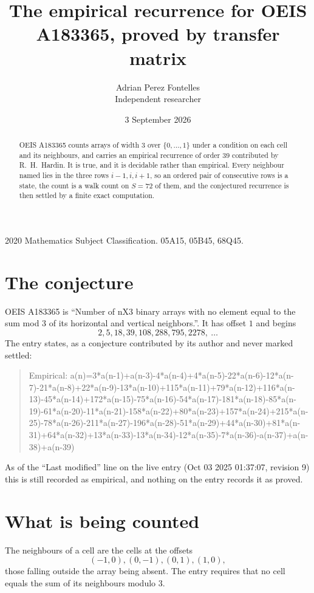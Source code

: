 \documentclass[11pt,a4paper]{article}
\title{The empirical recurrence for OEIS A183365, proved by transfer matrix}
\author{Adrian Perez Fontelles\\ \small Independent researcher}
\date{3 September 2026}
\theoremstyle{plain}
\theoremstyle{definition}
\begin{document}
\maketitle

\begin{abstract}
OEIS A183365 counts arrays of width $3$ over $\{0,\dots,1\}$ under a condition on each cell
and its neighbours, and carries an empirical recurrence of order $39$ contributed by
R.~H.~Hardin. It is true, and it is decidable rather than empirical. Every neighbour named lies
in the three rows $i-1,i,i+1$, so an ordered pair of consecutive rows is a state, the count is
a walk count on $S=72$ of them, and the conjectured recurrence is then settled by a finite
exact computation.
\end{abstract}

\noindent\small 2020 Mathematics Subject Classification. 05A15, 05B45, 68Q45.\normalsize

\section{The conjecture}

OEIS A183365 is ``Number of nX3 binary arrays with no element equal to the sum mod 3 of its horizontal and vertical neighbors.''. It has offset $1$ and begins
\[
2, 5, 18, 39, 108, 288, 795, 2278,\ \dots
\]
The entry states, as a conjecture contributed by its author and never marked settled:
\begin{quote}
Empirical: a(n)=3*a(n-1)+a(n-3)-4*a(n-4)+4*a(n-5)-22*a(n-6)-12*a(n-7)-21*a(n-8)+22*a(n-9)-13*a(n-10)+115*a(n-11)+79*a(n-12)+116*a(n-13)-45*a(n-14)+172*a(n-15)-75*a(n-16)-54*a(n-17)-181*a(n-18)-85*a(n-19)-61*a(n-20)-11*a(n-21)-158*a(n-22)+80*a(n-23)+157*a(n-24)+215*a(n-25)-78*a(n-26)-211*a(n-27)-196*a(n-28)-51*a(n-29)+44*a(n-30)+81*a(n-31)+64*a(n-32)+13*a(n-33)-13*a(n-34)-12*a(n-35)-7*a(n-36)-a(n-37)+a(n-38)+a(n-39)
\end{quote}
As of the ``Last modified'' line on the live entry (Oct 03 2025 01:37:07, revision 9) this is still
recorded as empirical, and nothing on the entry records it as proved.

\section{What is being counted}

The neighbours of a cell are the cells at the offsets
\[
(-1,0), (0,-1), (0,1), (1,0),
\]
those falling outside the array being absent. The entry requires that no cell equals the sum of its neighbours modulo $3$.
\end{document}
